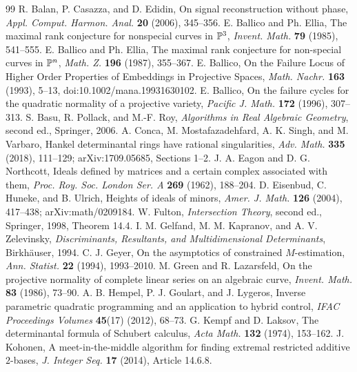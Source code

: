 \begin{thebibliography}{99}
 R. Balan, P. Casazza, and D. Edidin, On signal reconstruction without phase, \emph{Appl. Comput. Harmon. Anal.} \textbf{20} (2006), 345--356.
 E. Ballico and Ph. Ellia, The maximal rank conjecture for nonspecial curves in $\mathbb P^3$, \emph{Invent. Math.} \textbf{79} (1985), 541--555.
 E. Ballico and Ph. Ellia, The maximal rank conjecture for non-special curves in $\mathbb P^n$, \emph{Math. Z.} \textbf{196} (1987), 355--367.
 E. Ballico, On the Failure Locus of Higher Order Properties of Embeddings in Projective Spaces, \emph{Math. Nachr.} \textbf{163} (1993), 5--13, doi:10.1002/mana.19931630102.
 E. Ballico, On the failure cycles for the quadratic normality of a projective variety, \emph{Pacific J. Math.} \textbf{172} (1996), 307--313.
 S. Basu, R. Pollack, and M.-F. Roy, \emph{Algorithms in Real Algebraic Geometry}, second ed., Springer, 2006.
 A. Conca, M. Mostafazadehfard, A. K. Singh, and M. Varbaro, Hankel determinantal rings have rational singularities, \emph{Adv. Math.} \textbf{335} (2018), 111--129; arXiv:1709.05685, Sections 1--2.
 J. A. Eagon and D. G. Northcott, Ideals defined by matrices and a certain complex associated with them, \emph{Proc. Roy. Soc. London Ser. A} \textbf{269} (1962), 188--204.
 D. Eisenbud, C. Huneke, and B. Ulrich, Heights of ideals of minors, \emph{Amer. J. Math.} \textbf{126} (2004), 417--438; arXiv:math/0209184.
 W. Fulton, \emph{Intersection Theory}, second ed., Springer, 1998, Theorem 14.4.
 I. M. Gelfand, M. M. Kapranov, and A. V. Zelevinsky, \emph{Discriminants, Resultants, and Multidimensional Determinants}, Birkh\"auser, 1994.
 C. J. Geyer, On the asymptotics of constrained $M$-estimation, \emph{Ann. Statist.} \textbf{22} (1994), 1993--2010.
 M. Green and R. Lazarsfeld, On the projective normality of complete linear series on an algebraic curve, \emph{Invent. Math.} \textbf{83} (1986), 73--90.
 A. B. Hempel, P. J. Goulart, and J. Lygeros, Inverse parametric quadratic programming and an application to hybrid control, \emph{IFAC Proceedings Volumes} \textbf{45}(17) (2012), 68--73.
 G. Kempf and D. Laksov, The determinantal formula of Schubert calculus, \emph{Acta Math.} \textbf{132} (1974), 153--162.
 J. Kohonen, A meet-in-the-middle algorithm for finding extremal restricted additive $2$-bases, \emph{J. Integer Seq.} \textbf{17} (2014), Article 14.6.8.

\end{thebibliography}
